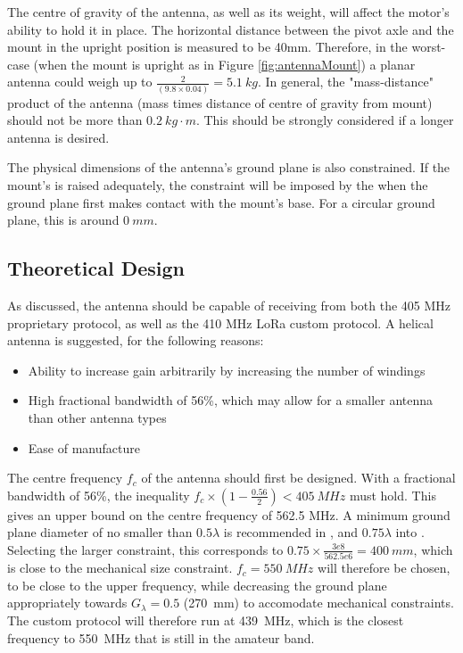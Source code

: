 The centre of gravity of the antenna, as well as its weight, will affect the motor's ability to hold it in place. The horizontal distance between the pivot axle and the mount in the upright position is measured to be 40mm. Therefore, in the worst-case (when the mount is upright as in Figure \ref{fig:antennaMount}) a planar antenna could weigh up to $\frac{2}{(9.8 \times 0.04)} = \SI{5.1}{kg}$. In general, the "mass-distance" product of the antenna (mass times distance of centre of gravity from mount) should not be more than $\SI{0.2}{kg \cdot m}$. This should be strongly considered if a longer antenna is desired.

The physical dimensions of the antenna's ground plane is also constrained. If the mount's is raised adequately, the constraint will be imposed by the when the ground plane first makes contact with the mount's base. For a circular ground plane, this is around $\SI{0}{mm}$.

\subsection{Theoretical Design}
As discussed, the antenna should be capable of receiving from both the 405 MHz proprietary protocol, as well as the 410 MHz LoRa custom protocol. A helical antenna is suggested, for the following reasons:
\begin{itemize}
    \item Ability to increase gain arbitrarily by increasing the number of windings
    \item High fractional bandwidth of 56\%, which may allow for a smaller antenna than other antenna types
    \item Ease of manufacture
\end{itemize}


The centre frequency $f_c$ of the antenna should first be designed. With a fractional bandwidth of 56\%, the inequality $f_c \times (1 - \frac{0.56}{2}) < \SI{405}{MHz}$ must hold. This gives an upper bound on the centre frequency of 562.5 MHz. A minimum ground plane diameter of no smaller than $0.5 \lambda$ is recommended in \cite{textbook-antennaTheoryAnalysisDesign}, and $0.75 \lambda$ into \cite{textbook-helicalAntenna}. Selecting the larger constraint, this corresponds to $0.75 \times \frac{3e8}{562.5e6} = \SI{400}{mm}$, which is close to the mechanical size constraint. $f_c = \SI{550}{MHz}$ will therefore be chosen, to be close to the upper frequency, while decreasing the ground plane appropriately towards $G_\lambda = 0.5$ (\SI{270}{mm}) to accomodate mechanical constraints. The custom protocol will therefore run at \SI{439}{MHz}, which is the closest frequency to \SI{550}{MHz} that is still in the amateur band.

